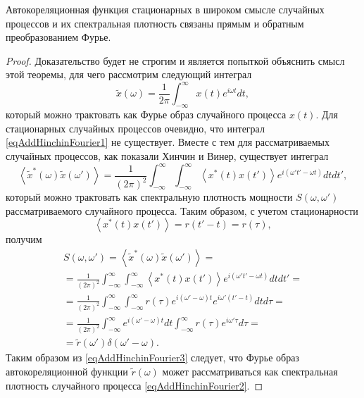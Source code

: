 \begin{theorem}
\label{thm:khinchin_wiener}
Автокореляционная функция стационарных в широком смысле случайных процессов
и их спектральная плотность связаны прямым и обратным
преобразованием Фурье.

\begin{proof}
Доказательство будет не строгим и является попыткой объяснить смысл
этой теоремы, для чего рассмотрим следующий интеграл
\begin{equation}
\tilde{x}\left(\omega\right) = \frac{1}{2 \pi}
\int_{-\infty}^{\infty}x\left(t\right)e^{i \omega t}dt,
\label{eqAddHinchinFourier1}
\end{equation}
который можно трактовать как Фурье образ случайного процесса
$x\left(t\right)$. Для стационарных случайных процессов очевидно, что
интеграл \eqref{eqAddHinchinFourier1} не существует. Вместе с тем для
рассматриваемых случайных процессов, как показали Хинчин и Винер,
существует интеграл
\begin{equation}
\left<\tilde{x}^{*}\left(\omega\right)\tilde{x}\left(\omega'\right)\right>
= 
\frac{1}{\left(2 \pi\right)^2}
\int_{-\infty}^{\infty}\int_{-\infty}^{\infty}\left<x^{*}\left(t\right)x\left(t'\right)\right>e^{i
  \left(\omega' t' - \omega t\right)}dtdt',
\label{eqAddHinchinFourier2}
\end{equation}
который можно трактовать как спектральную плотность мощности $S\left(\omega,\omega'\right)$
рассматриваемого случайного процесса. Таким образом, с учетом стационарности
\[
\left<x^{*}\left(t\right)x\left(t'\right)\right> = r\left(t' - t\right) = r\left(\tau\right),
\]
получим
\begin{eqnarray}
S\left(\omega, \omega'\right) =
\left<\tilde{x}^{*}\left(\omega\right)\tilde{x}\left(\omega'\right)\right>
= 
\nonumber \\
=
\frac{1}{\left(2 \pi\right)^2}
\int_{-\infty}^{\infty}\int_{-\infty}^{\infty}\left<x^{*}\left(t\right)x\left(t'\right)\right>e^{i
  \left(\omega' t' - \omega t\right)}dtdt' =
\nonumber \\
=
\frac{1}{\left(2 \pi\right)^2}
\int_{-\infty}^{\infty}\int_{-\infty}^{\infty}
r\left(\tau\right)
e^{i\left(\omega' - \omega\right) t}
e^{i\omega'\left(t' - t\right) }
dtd\tau =
\nonumber \\
=
\frac{1}{\left(2 \pi\right)^2}
\int_{-\infty}^{\infty}
e^{i \left(\omega' - \omega\right) t}dt 
\int_{-\infty}^{\infty}r\left(\tau\right)
e^{i \omega' \tau}d\tau =
\nonumber \\
= \tilde{r}\left(\omega'\right)\delta\left(\omega' - \omega\right). 
\label{eqAddHinchinFourier3}
\end{eqnarray}
Таким образом из \eqref{eqAddHinchinFourier3} следует, что Фурье образ
автокореляционной функции $\tilde{r}\left(\omega\right)$ может
рассматриваться как спектральная плотность случайного процесса
\eqref{eqAddHinchinFourier2}. 
\end{proof}
\end{theorem}
